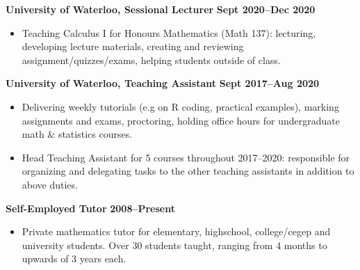 \documentclass[11pt, oneside]{article}   	%
\begin{document}
\vspace{4pt}

\textbf{University of Waterloo, Sessional Lecturer} \hfill \textbf{Sept 2020--Dec 2020}
\vspace{-4pt}
\begin{itemize}
\item Teaching Calculus I for Honours Mathematics (Math 137): lecturing, developing lecture materials, creating and reviewing assignment/quizzes/exams, helping students outside of class.
\end{itemize}

\vspace{4pt}

\textbf{University of Waterloo, Teaching Assistant} \hfill \textbf{Sept 2017--Aug 2020}
\vspace{-4pt}
\begin{itemize}
\item Delivering weekly tutorials (e.g on R coding, practical examples), marking assignments and exams, proctoring, holding office hours for undergraduate math \& statistics courses.
\vspace{-4pt}
\item Head Teaching Assistant for 5 courses throughout 2017--2020: responsible for organizing and delegating tasks to the other teaching assistants in addition to above duties.
\end{itemize}

\vspace{4pt}

\textbf{Self-Employed Tutor} \hfill \textbf{2008--Present}
\vspace{-4pt}
\begin{itemize}
\item Private mathematics tutor for elementary, highschool, college/cegep and university students. Over 30 students taught, ranging from 4 months to upwards of 3 years each.
\end{itemize}
\end{document}
